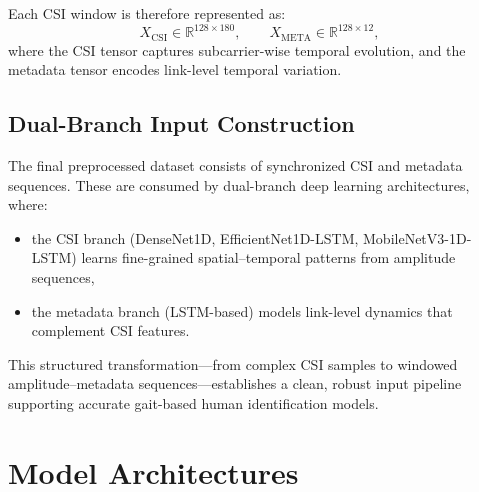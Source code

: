 Each CSI window is therefore represented as:
\[
X_{\text{CSI}} \in \mathbb{R}^{128 \times 180},
\qquad
X_{\text{META}} \in \mathbb{R}^{128 \times 12},
\]
where the CSI tensor captures subcarrier-wise temporal evolution, and the metadata tensor encodes link-level temporal variation.

\subsection{Dual-Branch Input Construction}

The final preprocessed dataset consists of synchronized CSI and metadata sequences. These are consumed by dual-branch deep learning architectures, where:
\begin{itemize}
    \item the CSI branch (DenseNet1D, EfficientNet1D-LSTM, MobileNetV3-1D-LSTM) learns fine-grained spatial–temporal patterns from amplitude sequences,
    \item the metadata branch (LSTM-based) models link-level dynamics that complement CSI features.
\end{itemize}

This structured transformation—from complex CSI samples to windowed amplitude–metadata sequences—establishes a clean, robust input pipeline supporting accurate gait-based human identification models.


\section{Model Architectures}

